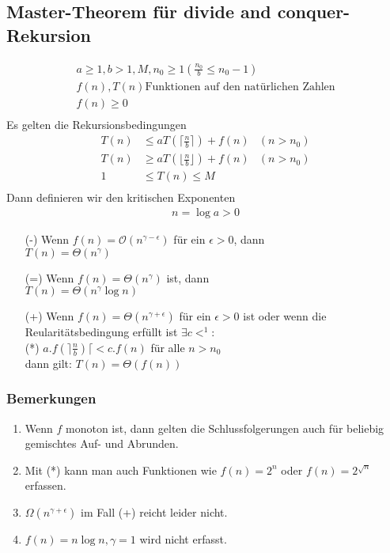 \subsection{Master-Theorem für divide and conquer-Rekursion}
\begin{align*}
a \geq 1, b > 1, M, n_0 \geq 1 (\frac{n_0}{b} \leq n_0 -1)\\
f(n),T(n) \text{Funktionen auf den natürlichen Zahlen}\\
f(n) \geq 0\\
\end{align*}
Es gelten die Rekursionsbedingungen 
\begin{align*}
T(n) & \leq a T(\lceil \frac{n}{b} \rceil) + f(n) & (n > n_0)\\
T(n) & \geq a T(\lfloor \frac{n}{b} \rfloor) + f(n) & (n > n_0)\\
1 & \leq T(n) \leq M\\
\end{align*}
Dann definieren wir den kritischen Exponenten
\begin{align*}
n = \log a > 0
\end{align*}
\begin{enumerate}
\item[(-)] Wenn $f(n) = \mathcal{O}(n^{\gamma - \epsilon})$ für ein $\epsilon > 0$, dann\\
$T(n) = \Theta (n^\gamma)$
\item[(=)] Wenn $f(n) = \Theta(n^\gamma)$ ist, dann \\
$T(n) = \Theta (n^\gamma \log n)$
\item[(+)] Wenn $f(n) = \Theta (n^{\gamma + \epsilon})$ für ein $\epsilon > 0$ ist oder wenn die Reularitätsbedingung erfüllt ist $\exists c < ^1$:\\
(*) $a.f(\rceil \frac{n}{b}) \lceil < c.f(n)$ für alle $n>n_0$\\
dann gilt:
$T(n) = \Theta(f(n))$
\end{enumerate}
\subsubsection{Bemerkungen}
\begin{enumerate}
\item Wenn $f$ monoton ist, dann gelten die Schlussfolgerungen auch für beliebig gemischtes Auf- und Abrunden.
\item Mit (*) kann man auch Funktionen wie $f(n) = 2^n$ oder $f(n) = 2^{\sqrt{n}}$ erfassen.
\item $\Omega (n^{\gamma + \epsilon})$ im Fall (+) reicht leider nicht.
\item $f(n) = n\log n, \gamma = 1$ wird nicht erfasst.
\end{enumerate}
